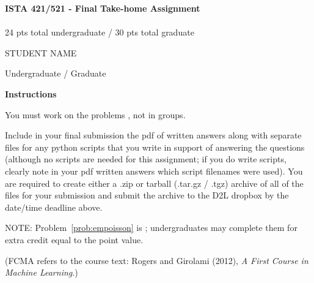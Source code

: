 \documentclass[10pt]{article}
\begin{document}
\begin{center}
    {\Large {\bf ISTA 421/521 - Final Take-home Assignment}} \\
     \\
    24 pts total undergraduate / 30 pts total graduate \\
    \vspace{1cm}
\end{center}

\begin{flushright}
STUDENT NAME  %

Undergraduate / Graduate %
\end{flushright}

\vspace{1cm}

{\Large {\bf Instructions}}

You must work on the problems , not in groups.
\begin{center}\end{center}

Include in your final submission the pdf of written answers along with separate files for any python scripts that you write in support of answering the questions (although no scripts are needed for this assignment; if you do write scripts, clearly note in your pdf written answers which script filenames were used).  You are required to create either a .zip or tarball (.tar.gz / .tgz) archive of all of the files for your submission and submit the archive to the D2L dropbox by the date/time deadline above.

NOTE: Problem~\ref{prob:empoisson} is ; undergraduates may complete them for extra credit equal to the point value.

(FCMA refers to the course text: Rogers and Girolami (2012), {\em A First Course in Machine Learning}.)

\vspace{.5cm}

\end{document}
